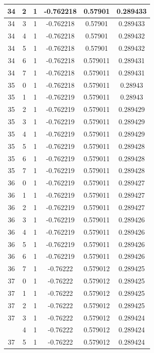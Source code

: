 \documentclass[12pt,a4paper]{article}
\numberwithin{equation}{section}
\numberwithin{figure}{section}
\numberwithin{table}{section}
\begin{document}
\begin{longtable}{|c|c|c|c|c|c|}
34 & 2 & 1 & -0.762218 & 0.57901 & 0.289433 \\ \hline
34 & 3 & 1 & -0.762218 & 0.57901 & 0.289433 \\ \hline
34 & 4 & 1 & -0.762218 & 0.57901 & 0.289432 \\ \hline
34 & 5 & 1 & -0.762218 & 0.57901 & 0.289432 \\ \hline
34 & 6 & 1 & -0.762218 & 0.579011 & 0.289431 \\ \hline
34 & 7 & 1 & -0.762218 & 0.579011 & 0.289431 \\ \hline
35 & 0 & 1 & -0.762218 & 0.579011 & 0.28943 \\ \hline
35 & 1 & 1 & -0.762219 & 0.579011 & 0.28943 \\ \hline
35 & 2 & 1 & -0.762219 & 0.579011 & 0.289429 \\ \hline
35 & 3 & 1 & -0.762219 & 0.579011 & 0.289429 \\ \hline
35 & 4 & 1 & -0.762219 & 0.579011 & 0.289429 \\ \hline
35 & 5 & 1 & -0.762219 & 0.579011 & 0.289428 \\ \hline
35 & 6 & 1 & -0.762219 & 0.579011 & 0.289428 \\ \hline
35 & 7 & 1 & -0.762219 & 0.579011 & 0.289428 \\ \hline
36 & 0 & 1 & -0.762219 & 0.579011 & 0.289427 \\ \hline
36 & 1 & 1 & -0.762219 & 0.579011 & 0.289427 \\ \hline
36 & 2 & 1 & -0.762219 & 0.579011 & 0.289427 \\ \hline
36 & 3 & 1 & -0.762219 & 0.579011 & 0.289426 \\ \hline
36 & 4 & 1 & -0.762219 & 0.579011 & 0.289426 \\ \hline
36 & 5 & 1 & -0.762219 & 0.579011 & 0.289426 \\ \hline
36 & 6 & 1 & -0.762219 & 0.579011 & 0.289426 \\ \hline
36 & 7 & 1 & -0.76222 & 0.579012 & 0.289425 \\ \hline
37 & 0 & 1 & -0.76222 & 0.579012 & 0.289425 \\ \hline
37 & 1 & 1 & -0.76222 & 0.579012 & 0.289425 \\ \hline
37 & 2 & 1 & -0.76222 & 0.579012 & 0.289425 \\ \hline
37 & 3 & 1 & -0.76222 & 0.579012 & 0.289424 \\ \hline
\pagebreak
37 & 4 & 1 & -0.76222 & 0.579012 & 0.289424 \\ \hline
37 & 5 & 1 & -0.76222 & 0.579012 & 0.289424 \\ \hline

\end{longtable}
\end{document}
